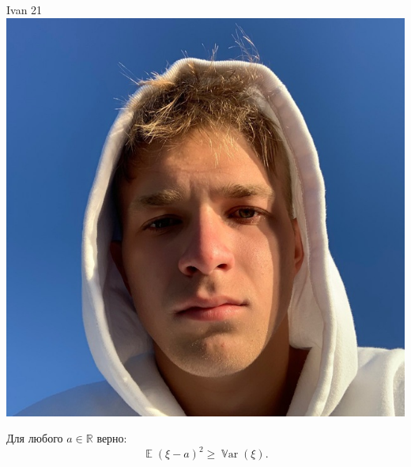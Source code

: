 \documentclass[12pt]{article}
\DeclareMathOperator{\E}{\mathbb{E}}
\DeclareMathOperator{\Var}{\mathbb{V}ar}
\begin{document}
\begin{minipage}{0.45\textwidth}
\begin{tinderm}{Ivan 21}
\includegraphics[width=\textwidth]{tinder-photo/ivan.jpg}

  

\begin{mybox}
Для любого $a \in \mathbb{R}$ верно:
\[
\E(\xi -a)^2 \ge \Var(\xi).
\]
\end{mybox}
\end{tinderm}
\end{minipage}
%
%
\end{document}

